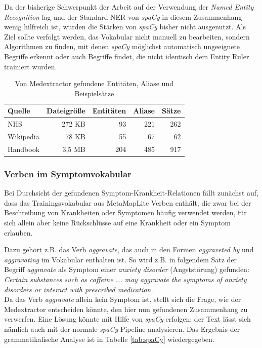 Da der bisherige Schwerpunkt der Arbeit auf der Verwendung der \emph{Named Entity Recognition} lag und der Standard-NER von \emph{spaCy} in diesem Zusammenhang wenig hilfreich ist, wurden die Stärken von \emph{spaCy} bisher nicht ausgenutzt. Als Ziel sollte verfolgt werden, das Vokabular nicht manuell zu bearbeiten, sondern Algorithmen zu finden, mit denen \emph{spaCy} möglichst automatisch ungeeignete Begriffe erkennt oder auch Begriffe findet, die nicht identisch dem Entity Ruler trainiert wurden.

\begin{table}
\begin{center}
\begin{tabular}{lrrrr}
\hline
\textbf{Quelle}	& \textbf{Dateigröße}	& \textbf{Entitäten} & \textbf{Aliase} & \textbf{Sätze} \\
\hline
NHS &	272 KB & 93 & 221 & 262 \\
Wikipedia & 78 KB & 55 & 67  & 62 \\
Handbook & 3,5 MB & 204 & 485  & 917 \\
\hline
\end{tabular}
\caption{Von Medextractor gefundene Entitäten, Aliase und Beispielsätze}
\label{tab:zaehlung}
\end{center}
\end{table}

\subsubsection{Verben im Symptomvokabular}
\label{subsec: verben} 

Bei Durchsicht der gefundenen Symptom-Krankheit-Relationen fällt zunächst auf, dass das Trainingsvokabular aus MetaMapLite Verben enthält, die zwar bei der Beschreibung von Krankheiten oder Symptomen häufig verwendet werden, für sich allein aber keine Rückschlüsse auf eine Krankheit oder ein Symptom erlauben.

Dazu gehört z.B. das Verb \emph{aggravate}, das auch in den Formen \emph{aggraveted by} und \emph{aggravating} im Vokabular enthalten ist. So wird z.B. in folgendem Satz der Begriff \emph{aggravate} als Symptom einer \emph{anxiety disorder} (Angststörung) gefunden:\\

\emph{\glqq Certain substances such as caffeine ... may aggravate the symptoms of anxiety disorders or interact with prescribed medication.\grqq}\\

Da das Verb \emph{aggravate} allein kein Symptom ist, stellt sich die Frage, wie der Medextractor entscheiden könnte, den hier nun gefundenen Zusammenhang zu verwerfen. Eine Lösung könnte mit Hilfe von \emph{spaCy} erfolgen: der Text lässt sich nämlich auch mit der normale \emph{spaCy}-Pipeline analysieren. Das Ergebnis der grammatikalische Analyse ist in Tabelle \ref{tab:spaCy} wiedergegeben.

